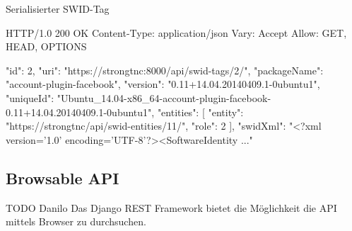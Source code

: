 \begin{listing}
\caption{Serialisierter SWID-Tag}
\begin{httpcode}
HTTP/1.0 200 OK
Content-Type: application/json
Vary: Accept
Allow: GET, HEAD, OPTIONS

{
    "id": 2, 
    "uri": "https://strongtnc:8000/api/swid-tags/2/", 
    "packageName": "account-plugin-facebook", 
    "version": "0.11+14.04.20140409.1-0ubuntu1", 
    "uniqueId": "Ubuntu_14.04-x86_64-account-plugin-facebook-0.11+14.04.20140409.1-0ubuntu1", 
    "entities": [
        {
            "entity": "https://strongtnc/api/swid-entities/11/", 
            "role": 2
        }
    ], 
    "swidXml": "<?xml version='1.0' encoding='UTF-8'?>\n<SoftwareIdentity ..."
}
\end{httpcode}
\end{listing}

\subsection{Browsable API}
TODO Danilo
Das Django REST Framework bietet die Möglichkeit die API mittels Browser zu durchsuchen. 
